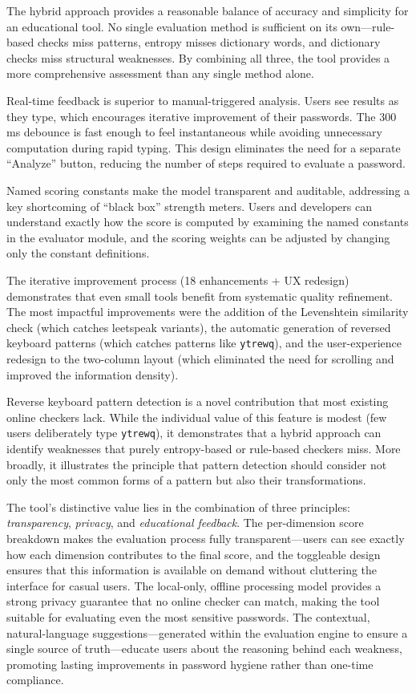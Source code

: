 The hybrid approach provides a reasonable balance of accuracy and simplicity for an educational tool. No single evaluation method is sufficient on its own---rule-based checks miss patterns, entropy misses dictionary words, and dictionary checks miss structural weaknesses. By combining all three, the tool provides a more comprehensive assessment than any single method alone.

Real-time feedback is superior to manual-triggered analysis. Users see results as they type, which encourages iterative improvement of their passwords. The 300\,ms debounce is fast enough to feel instantaneous while avoiding unnecessary computation during rapid typing. This design eliminates the need for a separate ``Analyze'' button, reducing the number of steps required to evaluate a password.

Named scoring constants make the model transparent and auditable, addressing a key shortcoming of ``black box'' strength meters. Users and developers can understand exactly how the score is computed by examining the named constants in the evaluator module, and the scoring weights can be adjusted by changing only the constant definitions.

The iterative improvement process (18 enhancements + UX redesign) demonstrates that even small tools benefit from systematic quality refinement. The most impactful improvements were the addition of the Levenshtein similarity check (which catches leetspeak variants), the automatic generation of reversed keyboard patterns (which catches patterns like \texttt{ytrewq}), and the user-experience redesign to the two-column layout (which eliminated the need for scrolling and improved the information density).

Reverse keyboard pattern detection is a novel contribution that most existing online checkers lack. While the individual value of this feature is modest (few users deliberately type \texttt{ytrewq}), it demonstrates that a hybrid approach can identify weaknesses that purely entropy-based or rule-based checkers miss. More broadly, it illustrates the principle that pattern detection should consider not only the most common forms of a pattern but also their transformations.

The tool's distinctive value lies in the combination of three principles: \textit{transparency}, \textit{privacy}, and \textit{educational feedback}. The per-dimension score breakdown makes the evaluation process fully transparent---users can see exactly how each dimension contributes to the final score, and the toggleable design ensures that this information is available on demand without cluttering the interface for casual users. The local-only, offline processing model provides a strong privacy guarantee that no online checker can match, making the tool suitable for evaluating even the most sensitive passwords. The contextual, natural-language suggestions---generated within the evaluation engine to ensure a single source of truth---educate users about the reasoning behind each weakness, promoting lasting improvements in password hygiene rather than one-time compliance.

